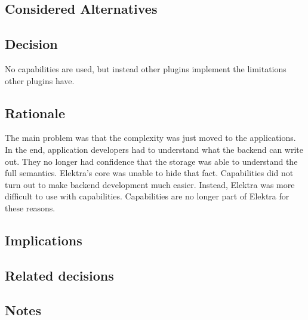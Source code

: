 \subsection*{Considered Alternatives}

\subsection*{Decision}

No capabilities are used, but instead other plugins implement the limitations other plugins have.

\subsection*{Rationale}

The main problem was that the complexity was just moved to the applications. In the end, application developers had to understand what the backend can write out. They no longer had confidence that the storage was able to understand the full semantics. Elektra’s core was unable to hide that fact. Capabilities did not turn out to make backend development much easier. Instead, Elektra was more difficult to use with capabilities. Capabilities are no longer part of Elektra for these reasons.

\subsection*{Implications}

\subsection*{Related decisions}

\subsection*{Notes}